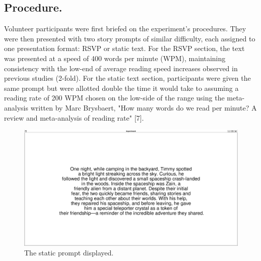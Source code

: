\documentclass[manuscript,screen]{acmart}
\begin{document}
\FloatBarrier

\subsection{Procedure.} 
Volunteer participants were first briefed on the experiment's procedures. They were then presented with two story prompts of similar difficulty, each assigned to one presentation format: RSVP or static text. For the RSVP section, the text was presented at a speed of 400 words per minute (WPM), maintaining consistency with the low-end of average reading speed increases observed in previous studies (2-fold). For the static text section, participants were given the same prompt but were allotted double the time it would take to assuming a reading rate of 200 WPM chosen on the low-side of the range using the meta-analysis written by Marc Brysbaert, "How many words do we read per minute? A review and meta-analysis of reading rate" [7].

\begin{figure}[htbp]
  \centering
  \includegraphics[width=\linewidth]{static-prompt.PNG}
  \caption{The static prompt displayed.}
\end{figure}

\FloatBarrier
\end{document}
